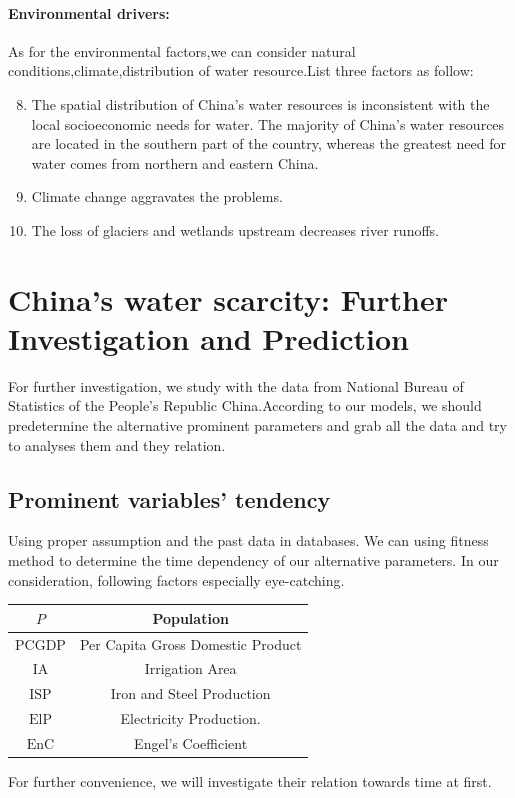 \paragraph{Environmental drivers:}As for the environmental factors,we can consider natural conditions,climate,distribution of water resource.\cite{Review}List three factors as follow:

\begin{enumerate}
\setcounter{enumi}{7}
\item The spatial distribution of China’s water resources is inconsistent with the local socioeconomic needs for water. The majority of China’s water resources are located in the southern part of the country, whereas the greatest need for water comes from northern and eastern China.
\item Climate change aggravates the problems.
\item The loss of glaciers and wetlands upstream decreases river runoffs.
\end{enumerate}


\section{China's water scarcity: Further Investigation and Prediction}

  For further investigation, we study with the data from National Bureau of Statistics of the People's Republic China\cite{ChinaDataBase}.According to our models, we should predetermine the alternative prominent parameters and grab all the data and try to analyses them and they relation.
  \subsection{Prominent variables' tendency}
  Using proper assumption and the past data in databases. We can using fitness method to determine the time dependency of our alternative parameters.
  In our consideration, following factors especially eye-catching.
  \begin{table}[!h]
  \centering
  \begin{tabular}{c|c}
  \hline
  $P$ & Population \\
  \hline
  $\text{PCGDP}$ & Per Capita Gross Domestic Product \\
  \hline
  $\text{IA}$ & Irrigation Area \\
  \hline
  $\text{ISP}$ & Iron and Steel Production \\
  \hline
  $\text{ElP}$ & Electricity Production. \\
  \hline
  $\text{EnC}$ & Engel's Coefficient \\
  \hline
  \end{tabular}
  \end{table}
  For further convenience, we will investigate their relation towards time at first.
